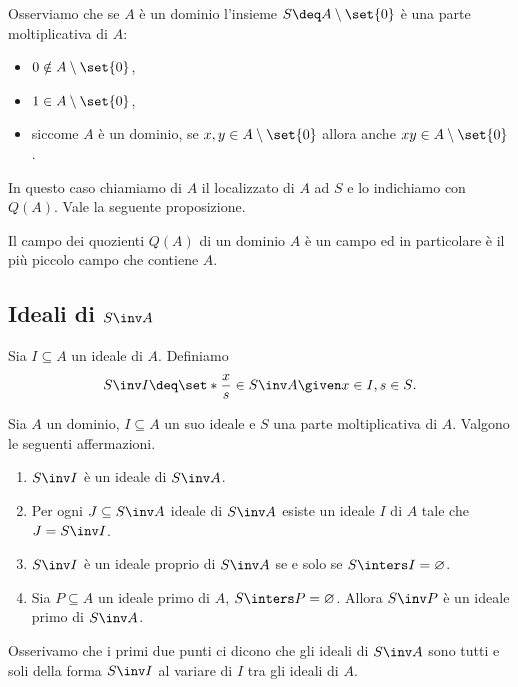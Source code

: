 Osserviamo che se $A$ è un dominio l'insieme $S \deq A \setminus \set{0}$ è una parte moltiplicativa di $A$:
\begin{itemize}
    \item $0 \notin A \setminus \set{0}$,
    \item $1 \in A \setminus \set{0}$,
    \item siccome $A$ è un dominio, se $x, y \in A \setminus \set{0}$ allora anche $xy \in A \setminus \set{0}$.
\end{itemize}

In questo caso chiamiamo  di $A$ il localizzato di $A$ ad $S$ e lo indichiamo con $Q(A)$. Vale la seguente proposizione.
\begin{proposition}{}{}
    Il campo dei quozienti $Q(A)$ di un dominio $A$ è un campo ed in particolare è il più piccolo campo che contiene $A$.
\end{proposition}

\subsection{Ideali di $S\inv A$}

Sia $I \subseteq A$ un ideale di $A$. Definiamo \[
    S\inv I \deq \set*{\frac{x}{s} \in S\inv A \given x \in I, s \in S}.    
\]

\begin{proposition}{}{}
    Sia $A$ un dominio, $I \subseteq A$ un suo ideale e $S$ una parte moltiplicativa di $A$. Valgono le seguenti affermazioni.
    \begin{enumerate}
        \item $S\inv I$ è un ideale di $S\inv A$.
        \item Per ogni $J \subseteq S\inv A$ ideale di $S\inv A$ esiste un ideale $I$ di $A$ tale che $J = S\inv I$.
        \item $S\inv I$ è un ideale proprio di $S\inv A$ se e solo se $S \inters I = \varnothing$.
        \item Sia $P \subseteq A$ un ideale primo di $A$, $S \inters P = \varnothing$. Allora $S\inv P$ è un ideale primo di $S\inv A$.
    \end{enumerate}
\end{proposition}

Osserivamo che i primi due punti ci dicono che gli ideali di $S\inv A$ sono tutti e soli della forma $S\inv I$ al variare di $I$ tra gli ideali di $A$.